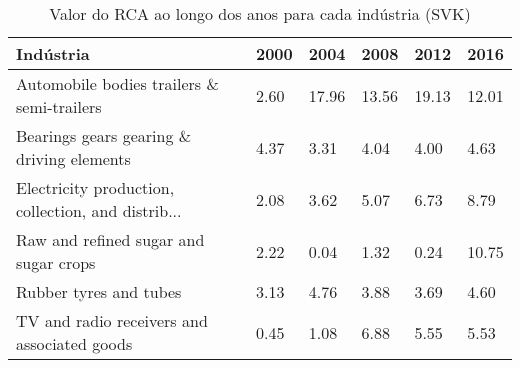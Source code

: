 \begin{table}
\centering
\caption{Valor do RCA ao longo dos anos para cada indústria (SVK)}
\label{tab:ex3-tempo-SVK}
\begin{tabular}{p{6cm}p{1.5cm}p{1.5cm}p{1.5cm}p{1.5cm}p{1.5cm}}
\toprule
                                         Indústria & 2000 &  2004 &  2008 &  2012 &  2016 \\
\midrule
        Automobile bodies trailers \& semi-trailers & 2.60 & 17.96 & 13.56 & 19.13 & 12.01 \\
         Bearings gears gearing \& driving elements & 4.37 &  3.31 &  4.04 &  4.00 &  4.63 \\
Electricity production, collection, and distrib... & 2.08 &  3.62 &  5.07 &  6.73 &  8.79 \\
             Raw and refined sugar and sugar crops & 2.22 &  0.04 &  1.32 &  0.24 & 10.75 \\
                            Rubber tyres and tubes & 3.13 &  4.76 &  3.88 &  3.69 &  4.60 \\
       TV and radio receivers and associated goods & 0.45 &  1.08 &  6.88 &  5.55 &  5.53 \\
\bottomrule
\end{tabular}
\end{table}
